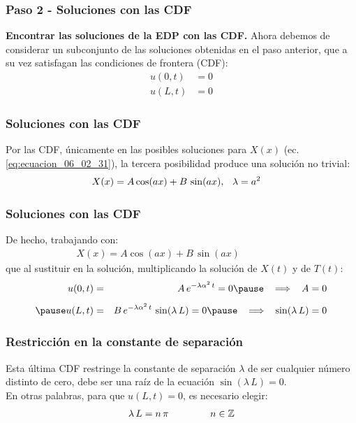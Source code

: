 \documentclass[12pt]{beamer}
\begin{document}
\begin{frame}
\frametitle{Paso 2 - Soluciones con las CDF}
\textbf{Encontrar las soluciones de la EDP con las CDF.}
\pause
Ahora debemos de considerar un subconjunto de las soluciones obtenidas en el paso anterior, que a su vez satisfagan las condiciones de frontera (CDF):
\pause
\begin{align*}
u (0, t) &= 0 \\[0.5em]
u (L, t) &= 0
\end{align*}
\end{frame}
\begin{frame}
\frametitle{Soluciones con las CDF}
Por las CDF, únicamente en las posibles soluciones para $X(x)$ (ec. \ref{eq:ecuacion_06_02_31}), la tercera posibilidad produce una solución no trivial:
\pause
\begin{align*}
X (x) = A \cos (a x ) + B \, \sin (a x), & \hspace{0.2cm} \lambda = a^{2}
\end{align*}
\end{frame}
\begin{frame}
\frametitle{Soluciones con las CDF}
De hecho, trabajando con:
\pause
\begin{align*}
X (x) = A \cos (a x) + B \, \sin (a x) \hspace{2cm}
\end{align*}
\pause
que al sustituir en la solución, multiplicando la solución de $X (t)$ y de $T (t)$:
\begin{eqnarray*}
u (0, t) &=& A \, e^{-\lambda \alpha^{2} \, t} = 0 \pause \hspace{0.3cm} \Longrightarrow \hspace{0.3cm} A = 0 \\[0.5em] \pause
u (L, t) &=& B \, e^{-\lambda \alpha^{2} \, t} \, \sin (\lambda \, L) = 0 \pause \hspace{0.3cm} \Longrightarrow \hspace{0.3cm} \sin (\lambda \, L) = 0
\end{eqnarray*}
\end{frame}
\begin{frame}
\frametitle{Restricción en la constante de separación}
Esta última CDF restringe la constante de separación $\lambda$ de ser cualquier número distinto de cero, debe ser una raíz de la ecuación $\sin (\lambda \, L) = 0$.
\\
\bigskip
\pause
En otras palabras, para que $u (L, t) = 0$, es necesario elegir:
\pause
\begin{align}
\lambda \, L = n \, \pi \hspace{1.5cm} n \in \mathbb{Z}
\label{eq:ecuacion_06_02_34}    
\end{align}
\end{frame}
\end{document}
